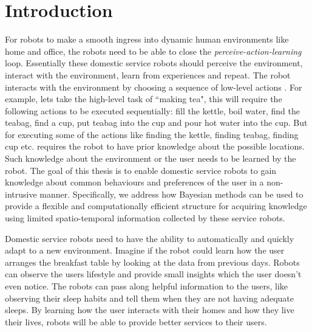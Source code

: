\chapter{Introduction}


For robots to make a smooth ingress into dynamic human environments like home and office, the robots need to be able to close the \emph{perceive-action-learning} loop. Essentially these domestic service robots should perceive the environment, interact with the environment, learn from experiences and repeat. The robot interacts with the environment by choosing a sequence of low-level actions . For example, lets take the high-level task of ``making tea", this will require the following actions to be executed sequentially: fill the kettle, boil water, find the teabag, find a cup, put teabag into the cup and pour hot water into the cup. But for executing some of the actions like finding the kettle, finding teabag, finding cup etc. requires the robot to have prior knowledge about the possible locations. Such knowledge about the environment or the user needs to be learned by the robot. The goal of this thesis is to enable domestic service robots to gain knowledge about common behaviours and preferences of the user in a non-intrusive manner. Specifically, we address how Bayesian methods can be used to provide a flexible and computationally efficient structure for acquiring knowledge using limited spatio-temporal information collected by these service robots.

Domestic service robots need to have the ability to automatically and quickly adapt to a new environment. Imagine if the robot could learn how the user arranges the breakfast table by looking at the data from previous days. Robots can observe the users lifestyle and provide small insights which the user doesn't even notice. The robots can pass along helpful information to the users, like observing their sleep habits and tell them when they are not having adequate sleeps. By learning how the user interacts with their homes and how they live their lives, robots will be able to provide better services to their users. 


